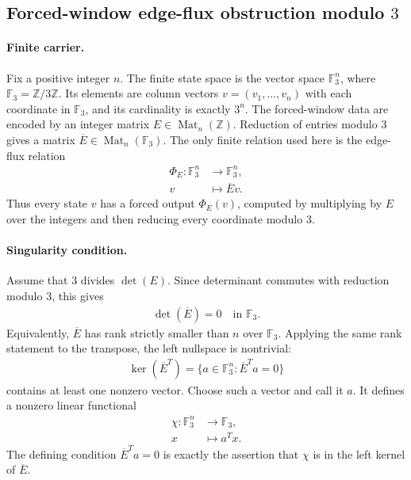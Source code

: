 \subsection{Forced-window edge-flux obstruction modulo $3$}\label{sec:f-a-window-edge-flux-mod3-obstruction}

\paragraph{Finite carrier.}
Fix a positive integer $n$. The finite state space is the vector space $\mathbb{F}_3^n$, where $\mathbb{F}_3=\mathbb{Z}/3\mathbb{Z}$. Its elements are column vectors $v=(v_1,\ldots,v_n)$ with each coordinate in $\mathbb{F}_3$, and its cardinality is exactly $3^n$. The forced-window data are encoded by an integer matrix $E\in \operatorname{Mat}_n(\mathbb{Z})$. Reduction of entries modulo $3$ gives a matrix $\overline E\in \operatorname{Mat}_n(\mathbb{F}_3)$. The only finite relation used here is the edge-flux relation
$$
\begin{aligned}
\Phi_E:\mathbb{F}_3^n&\longrightarrow \mathbb{F}_3^n,\\
v&\longmapsto \overline E v.
\end{aligned}
$$
Thus every state $v$ has a forced output $\Phi_E(v)$, computed by multiplying by $E$ over the integers and then reducing every coordinate modulo $3$.

\paragraph{Singularity condition.}
Assume that $3$ divides $\det(E)$. Since determinant commutes with reduction modulo $3$, this gives
$$
\begin{aligned}
\det(\overline E)=0\quad \text{in }\mathbb{F}_3.
\end{aligned}
$$
Equivalently, $\overline E$ has rank strictly smaller than $n$ over $\mathbb{F}_3$. Applying the same rank statement to the transpose, the left nullspace is nontrivial:
$$
\begin{aligned}
\ker(\overline E^{T})=\{a\in\mathbb{F}_3^n: \overline E^{T}a=0\}
\end{aligned}
$$
contains at least one nonzero vector. Choose such a vector and call it $a$. It defines a nonzero linear functional
$$
\begin{aligned}
\chi:\mathbb{F}_3^n&\longrightarrow \mathbb{F}_3,\\
x&\longmapsto a^{T}x.
\end{aligned}
$$
The defining condition $\overline E^T a=0$ is exactly the assertion that $\chi$ is in the left kernel of $\overline E$.

